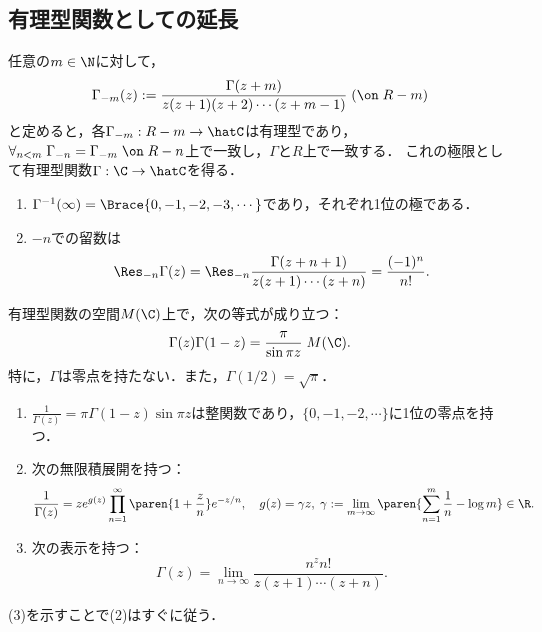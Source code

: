 \documentclass[uplatex, dvipdfmx]{jsreport}
\begin{document}
\subsection{有理型関数としての延長}

\begin{definition}
    任意の$m\in\N$に対して，
    \[\Gamma_{-m}(z):=\frac{\Gamma(z+m)}{z(z+1)(z+2)\cdots(z+m-1)}\;(\on\;R-m)\]
    と定めると，各$\Gamma_{-m}:R-m\to\hatC$は有理型であり，$\forall_{n<m}\;\Gamma_{-n}=\Gamma_{-m}\;\on\;R-n$上で一致し，$\Gamma$と$R$上で一致する．
    これの極限として有理型関数$\Gamma:\C\to\hatC$を得る．
\end{definition}

\begin{proposition}\mbox{}
    \begin{enumerate}
        \item $\Gamma^{-1}(\infty)=\Brace{0,-1,-2,-3,\cdots}$であり，それぞれ1位の極である．
        \item $-n$での留数は
        \[\Res_{-n}\Gamma(z)=\Res_{-n}\frac{\Gamma(z+n+1)}{z(z+1)\cdots(z+n)}=\frac{(-1)^n}{n!}.\]
    \end{enumerate}
\end{proposition}

\begin{theorem}[反転公式]
    有理型関数の空間$M(\C)$上で，次の等式が成り立つ：
    \[\Gamma(z)\Gamma(1-z)=\frac{\pi}{\sin \pi z}\; M(\C).\]
    特に，$\Gamma$は零点を持たない．また，$\Gamma(1/2)=\sqrt{\pi}$．
\end{theorem}

\begin{proposition}\mbox{}
    \begin{enumerate}
        \item $\frac{1}{\Gamma(z)}=\pi\Gamma(1-z)\sin\pi z$は整関数であり，$\{0,-1,-2,\cdots\}$に1位の零点を持つ．
        \item 次の無限積展開を持つ：
        \[\frac{1}{\Gamma(z)}=ze^{g(z)}\prod^\infty_{n=1}\paren{1+\frac{z}{n}}e^{-z/n},\quad g(z)=\gamma z,\;\gamma:=\lim_{m\to\infty}\paren{\sum^m_{n=1}\frac{1}{n}-\log m}\in\R.\]
        \item 次の表示を持つ：
        \[\Gamma(z)=\lim_{n\to\infty}\frac{n^zn!}{z(z+1)\cdots(z+n)}.\]
    \end{enumerate}
\end{proposition}
\begin{Proof}
    (3)を示すことで(2)はすぐに従う．
\end{Proof}
\end{document}
